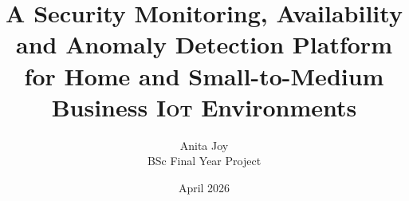 \documentclass[a4paper,12pt,openany]{report}
\title{A Security Monitoring, Availability and Anomaly Detection Platform for Home and Small-to-Medium Business \textsc{Iot} Environments}
\author{Anita Joy\\[0.5em]\normalsize BSc Final Year Project}
\date{April 2026}
\begin{document}
\maketitle

\begin{abstract}

\end{abstract}

\tableofcontents
\listoffigures
\listoftables

\setcounter{chapter}{4}













\end{document}
